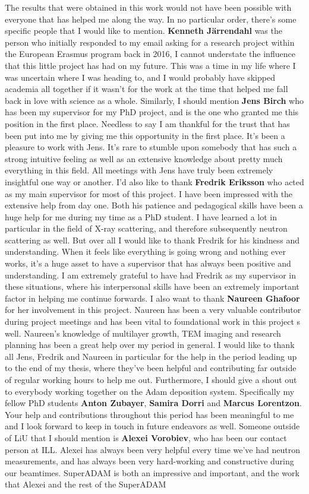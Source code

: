The results that were obtained in this work would not have been possible with everyone that has helped me along the way. In no particular order, there's some specific people that I would like to mention. \textbf{Kenneth Järrendahl} was the person who initially responded to my email asking for a research project within the European Erasmus program back in 2016, I cannot understate the influence that this little project has had on my future. This was a time in my life where I was uncertain where I was heading to, and I would probably have skipped academia all together if it wasn't for the work at the time that helped me fall back in love with science as a whole. Similarly, I should mention  \textbf{Jens Birch} who has been my supervisor for my PhD project, and is the one who granted me this position in the first place. Needless to say I am thankful for the trust that has been put into me by giving me this opportunity in the first place. It's been a pleasure to work with Jens. It's rare to stumble upon somebody that has such a strong intuitive feeling as well as an extensive knowledge about pretty much everything in this field. All meetings with Jens have truly been extremely insightful one way or another. I'd also like to thank \textbf{Fredrik Eriksson} who acted as my main supervisor for most of this project. I have been impressed with the extensive help from day one.  Both his patience and pedagogical skills have been a huge help for me during my time as a PhD student. I have learned a lot in particular in the field of X-ray scattering, and therefore subsequently neutron scattering as well. But over all I would like to thank Fredrik for his kindness and understanding. When it feels like everything is going wrong and nothing ever works, it's a huge asset to have a supervisor that has always been positive and understanding. I am extremely grateful to have had Fredrik as my supervisor in these situations, where his interpersonal skills have been an extremely important factor in helping me continue forwards. I also want to thank \textbf{Naureen Ghafoor} for her involvement in this project. Naureen has been a very valuable contributor during project meetings and has been vital to foundational work in this project s well. Naureen's knowledge of multilayer growth, TEM imaging and research planning has been a great help over my period in general. I would like to thank all Jens, Fredrik and Naureen in particular for the help in the period leading up to the end of my thesis, where they've been helpful and contributing far outside of regular working hours to help me out. Furthermore, I should give a shout out to everybody working together on the Adam deposition system. Specifically my fellow PhD students \textbf{Anton Zubayer}, \textbf{Samira Dorri} and \textbf{Marcus Lorentzon}. Your help and contributions throughout this period has been meaningful to me and I look forward to keep in touch in future endeavors as well. Someone outside of LiU that I should mention is \textbf{Alexei Vorobiev}, who has been our contact person at ILL. Alexei has always been very helpful every time we've had neutron measurements, and has always been very hard-working and constructive during our beamtimes. SuperADAM is both an impressive and important, and the work that Alexei and the rest of the SuperADAM 